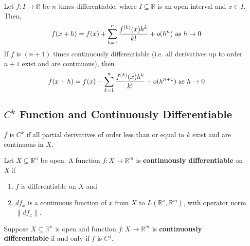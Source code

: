 \documentclass[11pt]{elegantbook}
\begin{document}
\begin{theorem}
    Let $f : I \rightarrow \mathbb{R}$ be $n$ times differentiable, where $I \subseteq \mathbb{R}$ is an open interval and $x \in I$. Then,
    \begin{equation}
        \begin{aligned}
            f(x+h)=f(x)+\sum_{k=1}^{n}\frac{f^{(k)}(x)h^k}{k!}+o(h^n) \textnormal{ as }h \rightarrow 0
        \end{aligned}
        \nonumber
    \end{equation}
    If $f$ is $(n + 1)$ times continuously differentiable (i.e. all derivatives up to order $n + 1$ exist and are continuous), then
    \begin{equation}
        \begin{aligned}
            f(x+h)=f(x)+\sum_{k=1}^{n}\frac{f^{(k)}(x)h^k}{k!}+o(h^{n+1}) \textnormal{ as }h \rightarrow 0
        \end{aligned}
        \nonumber
    \end{equation}
\end{theorem}

\subsection{$C^k$ Function and Continuously Differentiable}
\begin{definition}[$C^k$ Function]
    \normalfont
    $f$ is $C^k$ if all partial derivatives of order less than or equal to $k$ exist and are continuous in $X$.
\end{definition}

\begin{definition}
    \normalfont
    Let $X \subseteq \mathbb{R}^n$ be open. A function $f : X \rightarrow \mathbb{R}^m$ is \textbf{continuously differentiable} on $X$ if
    \begin{enumerate}
        \item $f$ is differentiable on $X$ and
        \item $df_x$ is a continuous function of $x$ from $X$ to $L(\mathbb{R}^n, \mathbb{R}^m)$, with operator norm $\|df_x\|$.
    \end{enumerate}
\end{definition}

\begin{theorem}
    Suppose $X \subseteq \mathbb{R}^n$ is open and function $f : X \rightarrow \mathbb{R}^m$ is \textbf{continuously differentiable} if and only if $f$ is $C^1$.
\end{theorem}
\end{document}
